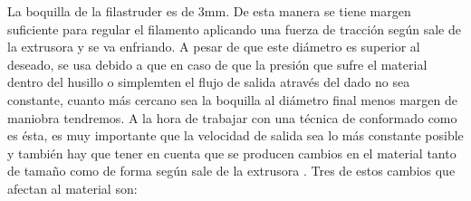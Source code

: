La boquilla de la filastruder es de 3mm. De esta manera se tiene margen suficiente para regular el filamento aplicando una fuerza de tracción según sale de la extrusora y se va enfriando. A pesar de que este diámetro es superior al deseado, se usa debido a que en caso de que la presión que sufre el material dentro del husillo o simplemten el flujo de salida através del dado no sea constante, cuanto más cercano sea la boquilla al diámetro final menos margen de maniobra tendremos. A la hora de trabajar con una técnica de conformado como es ésta, es muy importante que la velocidad de salida sea lo más constante posible y también hay que tener en cuenta que se producen cambios en el material tanto de tamaño como de forma según sale de la extrusora \cite{tecno_polimeros}. Tres de estos cambios que afectan al material son: 

